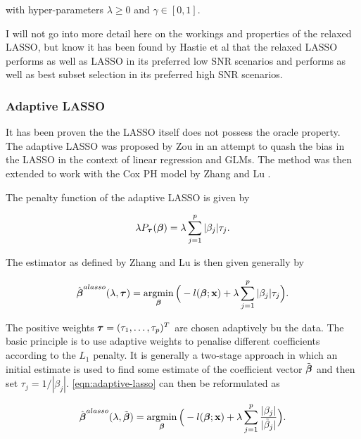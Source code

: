 with hyper-parameters $\lambda\geq0$ and $\gamma\in[0,1]$.

I will not go into more detail here on the workings and properties of the relaxed LASSO, but know it has been found by Hastie et al  that the relaxed LASSO performs as well as LASSO in its preferred low SNR scenarios and performs as well as best subset selection in its preferred high SNR scenarios.

\subsubsection{Adaptive LASSO}\label{sec:adaptive-lasso}

It has been proven the the LASSO itself does not possess the oracle property. The adaptive LASSO was proposed by Zou  in an attempt to quash the bias in the LASSO in the context of linear regression and GLMs. The method was then extended to work with the Cox PH model by Zhang and Lu .

The penalty function of the adaptive LASSO is given by

\begin{equation}
    \lambda P_{\boldsymbol{\tau}}(\boldsymbol{\beta}) = \lambda\sum_{j=1}^p|\beta_j|\tau_j.
\end{equation}

The estimator as defined by Zhang and Lu  is then given generally by

\begin{equation}\label{eqn:adaptive-lasso}
    \hat{\boldsymbol{\beta}}^{alasso}(\lambda,\boldsymbol{\tau})=\operatorname*{argmin}_{\boldsymbol{\beta}}\Big(-l(\boldsymbol{\beta};\textbf{x})+\lambda\sum_{j=1}^p|\beta_j|\tau_j\Big).
\end{equation}

The positive weights $\boldsymbol{\tau}=(\tau_1,\ldots,\tau_p)^T$ are chosen adaptively bu the data. The basic principle is to use adaptive weights to penalise different coefficients according to the $L_1$ penalty. It is generally a two-stage approach in which an initial estimate is used to find some estimate of the coefficient vector $\Tilde{\boldsymbol{\beta}}$ and then set $\tau_j = 1/|\beta_j|$. \cref{eqn:adaptive-lasso} can then be reformulated as

\begin{equation}\label{eqn:adaptive-lasso-reform}
    \hat{\boldsymbol{\beta}}^{alasso}(\lambda,\Tilde{\boldsymbol{\beta}})=\operatorname*{argmin}_{\boldsymbol{\beta}}\Big(-l(\boldsymbol{\beta};\textbf{x})+\lambda\sum_{j=1}^p\frac{|\beta_j|}{|\Tilde{\beta}_j|}\Big).
\end{equation}

